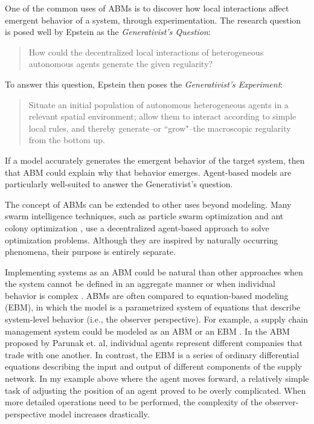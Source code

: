 One of the common uses of ABMs is to discover how local interactions affect emergent behavior of a system, through experimentation.
The research question is posed well by Epstein as the \textit{Generativist's Question}:
\begin{quote}
   How could the decentralized local interactions of heterogeneous autonomous agents generate the given regularity?
\end{quote}
To answer this question, Epstein then poses the \textit{Generativist's Experiment}:
\begin{quote}
Situate an initial population of autonomous heterogeneous agents in a relevant spatial environment; allow them to interact according to simple local rules, and thereby generate--or ``grow"--the macroscopic regularity from the bottom up. \cite{epstein1999agent}
\end{quote}
If a model accurately generates the emergent behavior of the target system, then that ABM could explain why that behavior emerges.
Agent-based models are particularly well-suited to answer the Generativist's question.

The concept of ABMs can be extended to other uses beyond modeling.
Many swarm intelligence techniques, such as particle swarm optimization \cite{kennedy1995pso} and ant colony optimization \cite{dorigo2004aco}, use a decentralized agent-based approach to solve optimization problems.
Although they are inspired by naturally occurring phenomena, their purpose is entirely separate.

Implementing systems as an ABM could be natural than other approaches when the system cannot be defined in an aggregate manner or when individual behavior is complex \cite{bonabeau2002agent}.
ABMs are often compared to equation-based modeling (EBM), in which the model is a parametrized system of equations that describe system-level behavior (i.e., the observer perspective).
For example, a supply chain management system could be modeled as an ABM or an EBM \cite{parunak1998agent}.
In the ABM proposed by Parunak et. al, individual agents represent different companies that trade with one another.
In contrast, the EBM is a series of ordinary differential equations describing the input and output of different components of the supply network.
In my example above where the agent moves forward, a relatively simple task of adjusting the position of an agent proved to be overly complicated.
When more detailed operations need to be performed, the complexity of the observer-perspective model increases drastically.

